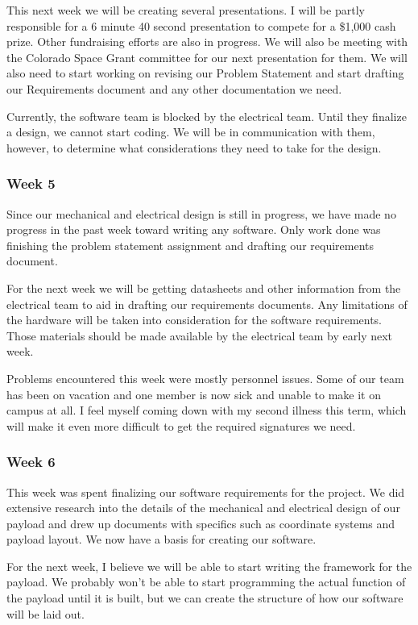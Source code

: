 \documentclass[letterpaper,10pt]{article}
\begin{document}
This next week we will be creating several presentations. I will be partly responsible for a 6 minute 40 second presentation to compete for a \$1,000 cash prize. Other fundraising efforts are also in progress. We will also be meeting with the Colorado Space Grant committee for our next presentation for them. We will also need to start working on revising our Problem Statement and start drafting our Requirements document and any other documentation we need.

Currently, the software team is blocked by the electrical team. Until they finalize a design, we cannot start coding. We will be in communication with them, however, to determine what considerations they need to take for the design.

\subsubsection{Week 5}
Since our mechanical and electrical design is still in progress, we have made no progress in the past week toward writing any software. Only work done was finishing the problem statement assignment and drafting our requirements document.

For the next week we will be getting datasheets and other information from the electrical team to aid in drafting our requirements documents. Any limitations of the hardware will be taken into consideration for the software requirements. Those materials should be made available by the electrical team by early next week.

Problems encountered this week were mostly personnel issues. Some of our team has been on vacation and one member is now sick and unable to make it on campus at all. I feel myself coming down with my second illness this term, which will make it even more difficult to get the required signatures we need.

\subsubsection{Week 6}
This week was spent finalizing our software requirements for the project. We did extensive research into the details of the mechanical and electrical design of our payload and drew up documents with specifics such as coordinate systems and payload layout. We now have a basis for creating our software.

For the next week, I believe we will be able to start writing the framework for the payload. We probably won't be able to start programming the actual function of the payload until it is built, but we can create the structure of how our software will be laid out.
\end{document}
